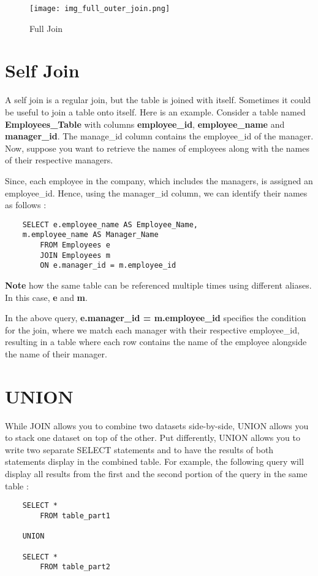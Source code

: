\documentclass[12pt, letterpaper]{article}
\begin{document}
\begin{figure}[H]
    \centering
    \texttt{[image: img\_full\_outer\_join.png]}
    \caption{Full Join}
    \label{fulljoin}
\end{figure}


\section{Self Join}
A self join is a regular join, but the table is joined with itself. Sometimes it could be useful to join a table onto itself. Here is an example. Consider a table named \textbf{Employees\_Table} with columns \textbf{employee\_id}, \textbf{employee\_name} and \textbf{manager\_id}. The manage\_id column contains the employee\_id of the manager. Now, suppose you want to retrieve the names of employees along with the names of their respective managers.

Since, each employee in the company, which includes the managers, is assigned an employee\_id. Hence, using the manager\_id column, we can identify their names as follows : 

\begin{verbatim}
    SELECT e.employee_name AS Employee_Name, 
    m.employee_name AS Manager_Name
        FROM Employees e
        JOIN Employees m 
        ON e.manager_id = m.employee_id
\end{verbatim}

\textbf{Note} how the same table can be referenced multiple times using different aliases. In this case, \textbf{e} and \textbf{m}.

In the above query, \textbf{e.manager\_id = m.employee\_id} specifies the condition for the join, where we match each manager with their respective employee\_id, resulting in a table where each row contains the name of the employee alongside the name of their manager.


\section{UNION}
While JOIN allows you to combine two datasets side-by-side, UNION allows you to stack one dataset on top of the other. Put differently, UNION allows you to write two separate SELECT statements and to have the results of both statements display in the combined table. For example, the following query will display all results from the first and the second portion of the query in the same table : 

\begin{verbatim}
    SELECT *
        FROM table_part1

    UNION

    SELECT *
        FROM table_part2
\end{verbatim}
\end{document}
